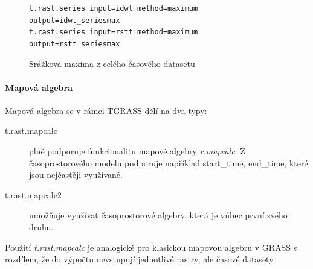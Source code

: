 \documentclass[a4paper,12pt,oneside]{report}
\begin{document}
\begin{figure}[h!]
\begin{footnotesize}
\lstset{extendedchars=false,
escapeinside=''}
\begin{lstlisting}[style=mybash]
t.rast.series input=idwt method=maximum output=idwt_seriesmax           
t.rast.series input=rstt method=maximum output=rstt_seriesmax    
\end{lstlisting}
\end{footnotesize} 
\end{figure}


\begin{figure}[h!]%
    \centering
    \qquad

    \caption[Serie max]{ Srážková maxima z celého časového datasetu  \centering }
\end{figure}




\paragraph*{Mapová algebra}
Mapová algebra se v rámci TGRASS dělí na dva typy:
\begin{description}
\item [t.rast.mapcalc] plně podporuje funkcionalitu mapové algebry \textit{r.mapcalc}. Z časoprostorového modelu podporuje například start\_time, end\_time, které jsou nejčastěji využívané.
\item [t.rast.mapcalc2] umožňuje využívat časoprostorové algebry, která je vůbec první svého druhu.
\end{description}

Použití \textit{t.rast.mapcalc} je analogické pro klasickou mapovou
algebru v GRASS s rozdílem, že do výpočtu nevstupují jednotlivé
rastry, ale časové datasety.
\end{document}
